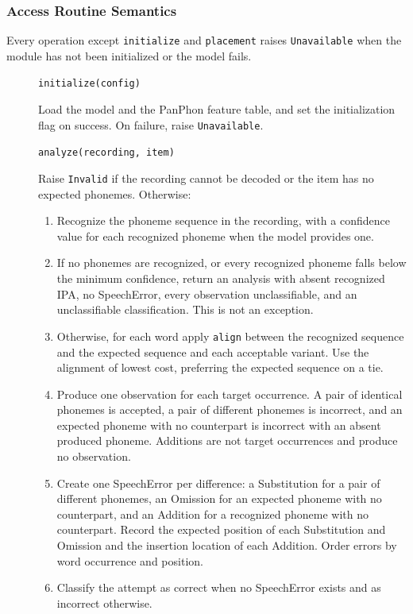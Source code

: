 \documentclass[12pt, titlepage]{article}
\begin{document}
\subsubsection{Access Routine Semantics}
Every operation except \texttt{initialize} and \texttt{placement} raises
\texttt{Unavailable} when the module has not been initialized or the model
fails.

\begin{description}
\item[] \texttt{initialize(config)}\par
Load the model and the PanPhon feature table, and set the initialization flag
on success. On failure, raise \texttt{Unavailable}.
\item[] \texttt{analyze(recording, item)}\par
Raise \texttt{Invalid} if the recording cannot be decoded or the item has no
expected phonemes. Otherwise:
\begin{enumerate}
\item Recognize the phoneme sequence in the recording, with a confidence value
for each recognized phoneme when the model provides one.
\item If no phonemes are recognized, or every recognized phoneme falls below
the minimum confidence, return an analysis with absent recognized IPA, no
SpeechError, every observation unclassifiable, and an unclassifiable
classification. This is not an exception.
\item Otherwise, for each word apply \texttt{align} between the recognized
sequence and the expected sequence and each acceptable variant. Use the
alignment of lowest cost, preferring the expected sequence on a tie.
\item Produce one observation for each target occurrence. A pair of identical
phonemes is accepted, a pair of different phonemes is incorrect, and an
expected phoneme with no counterpart is incorrect with an absent produced
phoneme. Additions are not target occurrences and produce no observation.
\item Create one SpeechError per difference: a Substitution for a pair of
different phonemes, an Omission for an expected phoneme with no counterpart,
and an Addition for a recognized phoneme with no counterpart. Record the
expected position of each Substitution and Omission and the insertion location
of each Addition. Order errors by word occurrence and position.
\item Classify the attempt as correct when no SpeechError exists and as
incorrect otherwise.

\end{enumerate}
\end{description}
\end{document}
